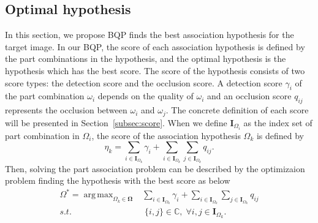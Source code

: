 \documentclass[runningheads]{llncs}
\DeclareMathOperator*{\argmax}{arg\,max}
\begin{document}
\subsection{Optimal hypothesis}
\label{subsec:optimal_hypothesis}
In this section, we propose BQP finds the best association hypothesis for the target image.
In our BQP, the score of each association hypothesis is defined by the part combinations in the hypothesis, and the optimal hypothesis is the hypothesis which has the best score.
The score of the hypothesis consists of two score types: the detection score and the occlusion score.
A detection score $\gamma_i$ of the part combination $\omega_i$ depends on the quality of $\omega_i$ and an occlusion score $q_{ij}$ represents the occlusion between $\omega_i$ and $\omega_j$.
The concrete definition of each score will be presented in Section~\ref{subsec:score}.
When we define $\mathbf{I}_{\Omega_i}$ as the index set of part combination in $\Omega_i$, the score of the association hypothesis $\Omega_k$ is defined by
\begin{equation}
   \label{eq:hypothesis_score}
   \eta_k = \sum_{i \in \mathbf{I}_{\Omega_k}} \gamma_i + \sum_{i \in \mathbf{I}_{\Omega_k}}\sum_{j \in \mathbf{I}_{\Omega_k}} q_{ij}.
\end{equation}
Then, solving the part association problem can be described by the optimizaion problem finding the hypothesis with the best score as below
\begin{equation}
   \label{eq:pedestrian_optimization}
   \begin{aligned}
      \Omega^* = \argmax_{\Omega_k \in \mathbf{\Omega}} & \sum_{i \in \mathbf{I}_{\Omega_k}} \gamma_i + \sum_{i \in \mathbf{I}_{\Omega_k}} \sum_{j \in \mathbf{I}_{\Omega_k}} q_{ij}\\
                 s.t. & \; \{i, j\} \in \mathbb{C}, \; \forall i,j \in \mathbf{I}_{\Omega_k}.
   \end{aligned}
\end{equation}
\end{document}
